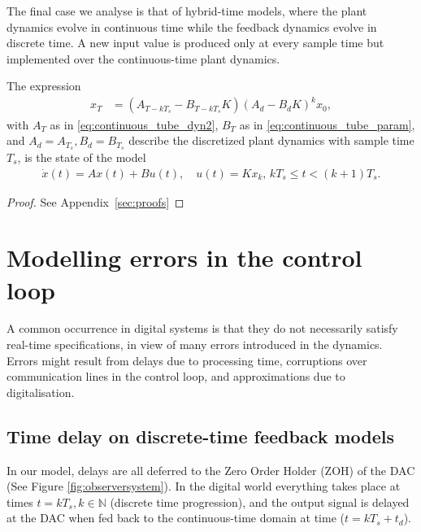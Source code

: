 \documentclass[sigconf]{llncs}
\newcommand{\mat}[1]{{#1}}
\renewcommand{\vec}[1]{{#1}}
\begin{document}
The final case we analyse is that of hybrid-time models, 
where the plant dynamics evolve in continuous time while the feedback dynamics evolve in discrete time.  
A new input value is produced only at every sample time but implemented over the continuous-time plant dynamics. 
%
\begin{theorem}
The expression
 \begin{align}
 \vec{x}_{T} &= (\mat{A}_{T-kT_s}-\mat{B}_{T-kT_s}\mat{K}) (\mat{A}_d-\mat{B}_d\mat{K})^k\vec{x}_0, 
 \label{eq:cyber_feedback}
 \end{align}
 with $\mat{A}_T$ as in \eqref{eq:continuous_tube_dyn2}, $\mat{B}_T$ as in \eqref{eq:continuous_tube_param}, 
 and $\mat{A}_d=\mat{A}_{T_s}, \mat{B}_d=\mat{B}_{T_s}$ describe the discretized plant dynamics with sample time $T_s$, 
 is the state of the model 
 \begin{align*}
 \dot{\vec{x}}(t) = \mat{A}\vec{x}(t)+\mat{B}\vec{u}(t), \quad 
 \vec{u}(t)=\mat{K}\vec{x}_k,  \,
 kT_s \leq t < (k+1)T_s. 
 \end{align*}
 \end{theorem}
\begin{proof}
See Appendix~\ref{sec:proofs}
\end{proof}

\section{Modelling errors in the control loop}\label{sec:errors}

A common occurrence in digital systems is that they do not necessarily satisfy real-time specifications, 
in view of many errors introduced in the dynamics. 
Errors might result from delays due to processing time,
corruptions over communication lines in the control loop, 
and approximations due to digitalisation.  

\subsection{Time delay on discrete-time feedback models} \label{sec:delay}

In our model, delays are all deferred to the Zero Order Holder (ZOH) of the DAC (See Figure \ref{fig:observersystem}). 
In the digital world everything takes place at times $t=kT_s, k \in \mathbb{N}$ (discrete time progression),
and the output signal is delayed at the DAC when fed back to the continuous-time domain at time ($t=kT_s+t_d$).
\end{document}
